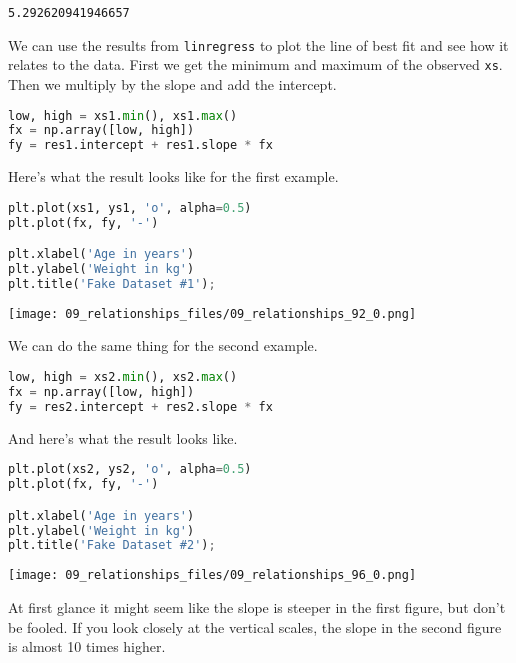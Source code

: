 \begin{lstlisting}[style=output]
5.292620941946657
\end{lstlisting}

We can use the results from \passthrough{\lstinline!linregress!} to plot
the line of best fit and see how it relates to the data. First we get
the minimum and maximum of the observed \passthrough{\lstinline!xs!}.
Then we multiply by the slope and add the intercept.

\begin{lstlisting}[language=Python,style=source]
low, high = xs1.min(), xs1.max()
fx = np.array([low, high])
fy = res1.intercept + res1.slope * fx
\end{lstlisting}

Here's what the result looks like for the first example.

\begin{lstlisting}[language=Python,style=source]
plt.plot(xs1, ys1, 'o', alpha=0.5)
plt.plot(fx, fy, '-')

plt.xlabel('Age in years')
plt.ylabel('Weight in kg')
plt.title('Fake Dataset #1');
\end{lstlisting}

\begin{center}
\texttt{[image: 09\_relationships\_files/09\_relationships\_92\_0.png]}
\end{center}

We can do the same thing for the second example.

\begin{lstlisting}[language=Python,style=source]
low, high = xs2.min(), xs2.max()
fx = np.array([low, high])
fy = res2.intercept + res2.slope * fx
\end{lstlisting}

And here's what the result looks like.

\begin{lstlisting}[language=Python,style=source]
plt.plot(xs2, ys2, 'o', alpha=0.5)
plt.plot(fx, fy, '-')

plt.xlabel('Age in years')
plt.ylabel('Weight in kg')
plt.title('Fake Dataset #2');
\end{lstlisting}

\begin{center}
\texttt{[image: 09\_relationships\_files/09\_relationships\_96\_0.png]}
\end{center}

At first glance it might seem like the slope is steeper in the first
figure, but don't be fooled. If you look closely at the vertical scales,
the slope in the second figure is almost 10 times higher.

